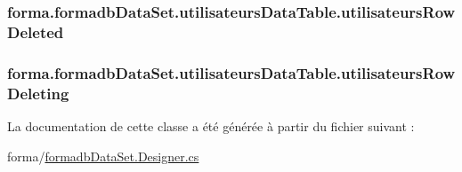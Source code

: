 \subsubsection[{\texorpdfstring{utilisateurs\+Row\+Deleted}{utilisateursRowDeleted}}]{ forma.\+formadb\+Data\+Set.\+utilisateurs\+Data\+Table.\+utilisateurs\+Row\+Deleted}\hypertarget{classforma_1_1formadb_data_set_1_1utilisateurs_data_table_a53ecd0e63d00b2920305cd695da42463}{}\label{classforma_1_1formadb_data_set_1_1utilisateurs_data_table_a53ecd0e63d00b2920305cd695da42463}
\subsubsection[{\texorpdfstring{utilisateurs\+Row\+Deleting}{utilisateursRowDeleting}}]{ forma.\+formadb\+Data\+Set.\+utilisateurs\+Data\+Table.\+utilisateurs\+Row\+Deleting}\hypertarget{classforma_1_1formadb_data_set_1_1utilisateurs_data_table_a23794d228bce8ca049221af0eb66a3fc}{}\label{classforma_1_1formadb_data_set_1_1utilisateurs_data_table_a23794d228bce8ca049221af0eb66a3fc}


La documentation de cette classe a été générée à partir du fichier suivant \+:\begin{DoxyCompactItemize}
\item 
forma/\hyperlink{formadb_data_set_8_designer_8cs}{formadb\+Data\+Set.\+Designer.\+cs}\end{DoxyCompactItemize}
